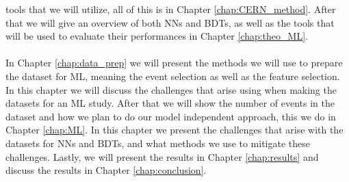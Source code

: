 \documentclass[12pt, a4paper]{book}
\begin{document}
tools that we will utilize, all of this is in Chapter \ref{chap:CERN_method}. After that we will give an overview of both NNs and BDTs, as well as the tools that will be used to evaluate their performances in Chapter \ref{chap:theo_ML}.\\
\\In Chapter \ref{chap:data_prep} we will present the methods we will use to prepare the dataset for ML, meaning the event selection as well as the feature selection. In this chapter we will discuss the challenges that arise using when making the datasets for an ML study. After that we will show the number of events in the dataset and 
how we plan to do our model independent approach, this we do in Chapter \ref{chap:ML}. In this chapter we present the challenges that arise with the datasets for NNs and BDTs, and what methods we use to mitigate these challenges. Lastly, we will present the results in Chapter \ref{chap:results} 
and discuss the results in Chapter \ref{chap:conclusion}.
\end{document}
